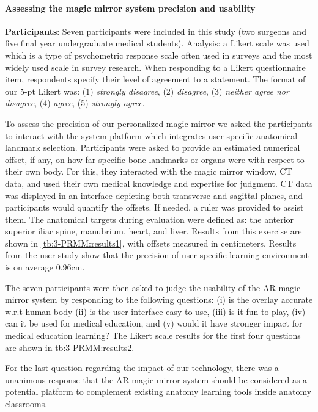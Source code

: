 \paragraph{Assessing the magic mirror system precision and usability}
\textbf{Participants}: Seven participants were included in this study (two surgeons and five final year undergraduate medical students). 
Analysis: a Likert scale was used which is a type of psychometric response scale often used in surveys and the most widely used scale in survey research. When responding to a Likert questionnaire item, respondents specify their level of agreement to a statement. The format of our 5-pt Likert was: (1) \textit{strongly disagree}, (2) \textit{disagree}, (3) \textit{neither agree nor disagree}, (4) \textit{agree}, (5) \textit{strongly agree}. 

To assess the precision of our personalized magic mirror we asked the participants to interact with the system platform which integrates user-specific anatomical landmark selection. Participants were asked to provide an estimated numerical offset, if any, on how far specific bone landmarks or organs were with respect to their own body. For this, they interacted with the magic mirror window, CT data, and used their own medical knowledge and expertise for judgment. CT data was displayed in an interface depicting both transverse and sagittal planes, and participants would quantify the offsets. If needed, a ruler was provided to assist them. The anatomical targets during evaluation were defined as: the anterior superior iliac spine, manubrium, heart, and liver. Results from this exercise are shown in \tablename{\ref{tb:3-PRMM:results1}}, with offsets measured in centimeters. Results from the user study show that the precision of user-specific learning environment is on average 0.96cm.


The seven participants were then asked to judge the usability of the AR magic mirror system by responding to the following questions: (i) is the overlay accurate w.r.t human body (ii) is the user interface easy to use, (iii) is it fun to play, (iv) can it be used for medical education, and (v) would it have stronger impact for medical education learning?
The Likert scale results for the first four questions are shown in \tablename{tb:3-PRMM:results2}.


For the last question regarding the impact of our technology, there was a unanimous response that the AR magic mirror system should be considered as a potential platform to complement existing anatomy learning tools inside anatomy classrooms. 
